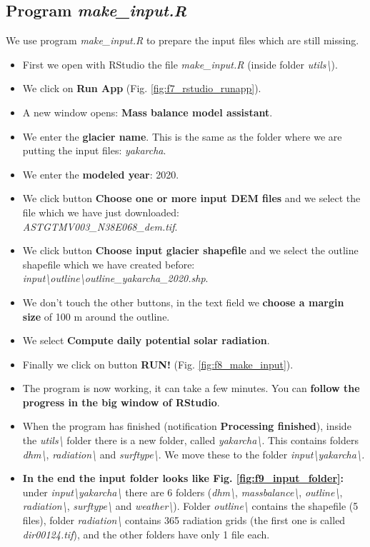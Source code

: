 \documentclass[15pt]{extarticle}
\begin{document}
\subsection{Program \textit{make\_input.R}}
\label{sect:input_make_input}
We use program \textit{make\_input.R} to prepare the input files which are still missing.
\begin{itemize}
    \item First we open with RStudio the file \textit{make\_input.R} (inside folder \textit{utils\textbackslash}).
    \item We click on \textbf{Run App} (Fig. \ref{fig:f7_rstudio_runapp}).
    \item A new window opens: \textbf{Mass balance model assistant}.
    \item We enter the \textbf{glacier name}. This is the same as the folder where we are putting the input files: \textit{yakarcha}.
    \item We enter the \textbf{modeled year}: 2020.
    \item We click button \textbf{Choose one or more input DEM files} and we select the file which we have just downloaded: \\\textit{ASTGTMV003\_N38E068\_dem.tif}.
    \item We click button \textbf{Choose input glacier shapefile} and we select the outline shapefile which we have created before: \textit{input\textbackslash outline\textbackslash outline\_yakarcha\_2020.shp}.
    \item We don't touch the other buttons, in the text field we \textbf{choose a margin size} of 100 m around the outline.
    \item We select \textbf{Compute daily potential solar radiation}.
    \item Finally we click on button \textbf{RUN!} (Fig. \ref{fig:f8_make_input}).
    \item The program is now working, it can take a few minutes. You can \textbf{follow the progress in the big window of RStudio}.
    \item When the program has finished (notification \textbf{Processing finished}), inside the \textit{utils\textbackslash} folder there is a new folder, called \textit{yakarcha\textbackslash}. This contains folders \textit{dhm\textbackslash}, \textit{radiation\textbackslash} and \textit{surftype\textbackslash}. We move these to the folder \textit{input\nolinebreak\textbackslash\nolinebreak yakarcha\textbackslash.}
    \item \textbf{In the end the input folder looks like Fig. \ref{fig:f9_input_folder}:} under \textit{input\textbackslash yakarcha\textbackslash} there are 6 folders (\textit{dhm\textbackslash}, \textit{massbalance\textbackslash}, \textit{outline\textbackslash}, \textit{radiation\textbackslash}, \textit{surftype\textbackslash} and \textit{weather\textbackslash}). Folder \textit{outline\textbackslash} contains the shapefile (5 files), folder \textit{radiation\textbackslash} contains 365 radiation grids (the first one is called \textit{dir00124.tif}), and the other folders have only 1 file each.
\end{itemize}
\end{document}
